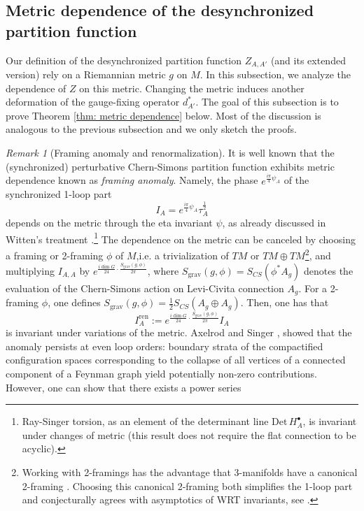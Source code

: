 \documentclass[11pt,a4paper]{amsart}
\theoremstyle{plain} %
\theoremstyle{definition}
\theoremstyle{remark}
\newtheorem{rem}[thm]{Remark}
\newcommand{\mr}{\mathrm}
\newcommand{\bt}{\bullet}
\begin{document}
{\subsection{Metric dependence of the desynchronized partition function}
Our definition of the desynchronized partition function $Z_{A,A'}$ (and its extended version) rely on a Riemannian metric $g$ on $M$. In this subsection, we analyze the dependence of $Z$ on this metric. Changing the metric induces another deformation of the gauge-fixing operator $d_{A'}^*$. The goal of this subsection is to prove Theorem \ref{thm: metric dependence} below. Most of the discussion is analogous to the previous subsection and we only sketch the proofs.
\begin{rem}[Framing anomaly and renormalization] It is well known that the (synchronized) perturbative Chern-Simons partition function exhibits metric dependence known as \emph{framing anomaly}. Namely, the phase $e^{\frac{i\pi}{4}\psi_A}$ of the synchronized 1-loop part 
$$ %
I_A=e^{\frac{i\pi}{4}\psi_A}\tau^\frac12_A$$ 
depends on the metric through the eta invariant $\psi$, as already discussed in Witten's treatment \cite{Witten1989}.\footnote{Ray-Singer torsion, as an element of the determinant line $\mr{Det}\,H_A^\bt$, is invariant under changes of metric (this result does not require the flat connection to be acyclic).}
The dependence on the metric can be canceled by choosing a framing or 2-framing $\phi$ of $M$,i.e. a trivialization of $TM$ or $TM \oplus TM$\footnote{Working with 2-framings has the advantage that 3-manifolds have a canonical 2-framing \cite{Atiyah1990}. Choosing this canonical 2-framing both simplifies the 1-loop part and conjecturally agrees with asymptotics of WRT invariants, see \cite{Freed1991}.}, and multiplying $I_{A,A}$ by $e^{\frac{i\dim G}{24}\cdot \frac{S_\mr{grav}(g,\phi)}{2\pi}}$, where 
$S_\mr{grav}(g,\phi) = S_{CS}(\phi^*A_{g})$ denotes the evaluation of the Chern-Simons action on Levi-Civita connection $A_g$. For a 2-framing $\phi$, one defines $S_\mr{grav}(g,\phi) = \frac12S_{CS}(A_g \oplus A_g)$. Then, one has that 
\begin{equation}\label{eq: ren I}
    I_{A}^\mr{ren}:= e^{\frac{i\dim G}{24}\cdot \frac{S_\mr{grav}(g,\phi)}{2\pi}}I_{A}
\end{equation}
is invariant under variations of the metric. Axelrod and Singer \cite{Axelrod1991},\cite{Axelrod1994} showed that the anomaly persists at 
even loop orders: boundary strata of the compactified configuration spaces corresponding to the collapse of all vertices of a connected component of a Feynman graph yield potentially non-zero contributions. However, one can show that there exists a power series 

\end{rem}}
\end{document}
